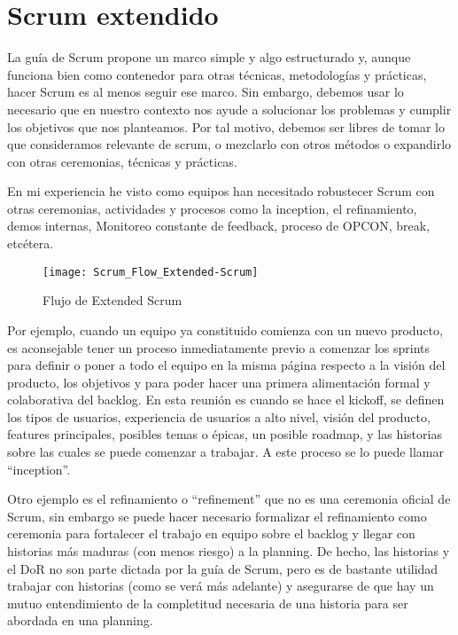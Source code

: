 \newpage
\section{Scrum extendido}

La guía de Scrum propone un marco simple y algo estructurado y, aunque funciona bien como contenedor para otras técnicas, metodologías y prácticas, hacer Scrum es al menos seguir ese marco. Sin embargo, debemos usar lo necesario que en nuestro contexto nos ayude a solucionar los problemas y cumplir los objetivos que nos planteamos. Por tal motivo, debemos ser libres de tomar lo que consideramos relevante de scrum, o mezclarlo con otros métodos o expandirlo con otras ceremonias, técnicas y prácticas.

En mi experiencia he visto como equipos han necesitado robustecer Scrum con otras ceremonias, actividades y procesos como la inception, el refinamiento, demos internas, Monitoreo constante de feedback, proceso de OPCON, break, etcétera. 

\begin{figure}[h]
  \centering
  \texttt{[image: Scrum\_Flow\_Extended-Scrum]}
  \caption{Flujo de Extended Scrum}
  \centering
  \label{fig:Scrum_Flow_Extended-Scrum} %
\end{figure}
\FloatBarrier %

Por ejemplo, cuando un equipo ya constituido comienza con un nuevo producto, es aconsejable tener un proceso inmediatamente previo a comenzar los sprints para definir o poner a todo el equipo en la misma página respecto a la visión del producto, los objetivos y para poder hacer una primera alimentación formal y colaborativa del backlog. En esta reunión es cuando se hace el kickoff, se definen los tipos de usuarios, experiencia de usuarios a alto nivel, visión del producto, features principales, posibles temas o épicas, un posible roadmap, y las historias sobre las cuales se puede comenzar a trabajar. A este proceso se lo puede llamar “inception”.

Otro ejemplo es el refinamiento o “refinement” que no es una ceremonia oficial de Scrum, sin embargo se puede hacer necesario formalizar el refinamiento como ceremonia para fortalecer el trabajo en equipo sobre el backlog y llegar con historias más maduras (con menos riesgo) a la planning. De hecho, las historias y el DoR no son parte dictada por la guía de Scrum, pero es de bastante utilidad trabajar con historias (como se verá más adelante) y asegurarse de que hay un mutuo entendimiento de la completitud necesaria de una historia para ser abordada en una planning.

